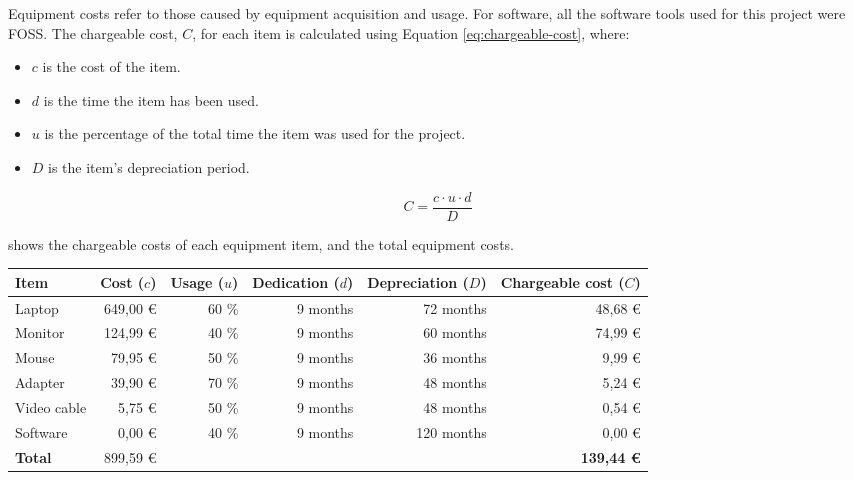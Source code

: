 Equipment costs refer to those caused by equipment acquisition and usage. For software, all the software tools used for this project were \gls{FOSS}. The chargeable cost, $C$, for each item is calculated using Equation \eqref{eq:chargeable-cost}, where:
\begin{itemize}
  \item $c$ is the cost of the item.
  \item $d$ is the time the item has been used.
  \item $u$ is the percentage of the total time the item was used for the project.
  \item $D$ is the item's depreciation period.
\end{itemize}

\begin{equation}\label{eq:chargeable-cost}
  C = \frac{c \cdot u \cdot d}{D}
\end{equation}

 shows the chargeable costs of each equipment item, and the total equipment costs.

\begin{table}[htb]
    {
      \begin{adjustbox}{max width=\textwidth}  %
        \begin{tabular}{lrrrrr}
          \toprule
          \textbf{Item} & \textbf{Cost ($c$)} & \textbf{Usage ($u$)} & \textbf{Dedication ($d$)} & \textbf{Depreciation ($D$)} & \textbf{Chargeable cost ($C$)}   \\
          \midrule
          Laptop      & 649,00 \euro & 60 \% & 9 months &  72 months &  48,68 \euro \\
          Monitor     & 124,99 \euro & 40 \% & 9 months &  60 months &  74,99 \euro \\
          Mouse       &  79,95 \euro & 50 \% & 9 months &  36 months &   9,99 \euro \\
          Adapter     &  39,90 \euro & 70 \% & 9 months &  48 months &   5,24 \euro \\
          Video cable &   5,75 \euro & 50 \% & 9 months &  48 months &   0,54 \euro \\
          Software    &   0,00 \euro & 40 \% & 9 months & 120 months &   0,00 \euro \\
          \midrule
          \textbf{Total}
                      & 899,59 \euro &       &          &           &\textbf{139,44 \euro} \\
          \bottomrule
        \end{tabular}
      \end{adjustbox}
    }
\end{table}


